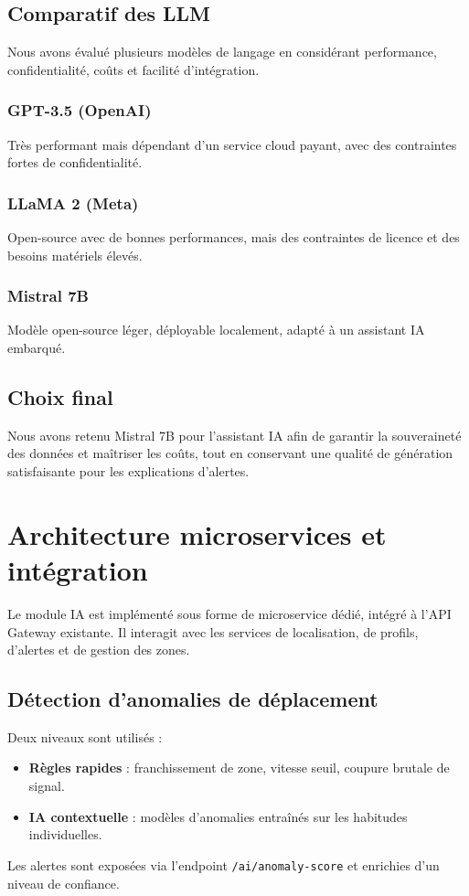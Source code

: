 \subsection{Comparatif des LLM}
Nous avons évalué plusieurs modèles de langage en considérant performance, confidentialité, coûts et facilité d'intégration.

\subsubsection{GPT-3.5 (OpenAI)}
Très performant mais dépendant d'un service cloud payant, avec des contraintes fortes de confidentialité.

\subsubsection{LLaMA 2 (Meta)}
Open-source avec de bonnes performances, mais des contraintes de licence et des besoins matériels élevés.

\subsubsection{Mistral 7B}
Modèle open-source léger, déployable localement, adapté à un assistant IA embarqué.

\subsection{Choix final}
Nous avons retenu Mistral 7B pour l'assistant IA afin de garantir la souveraineté des données et maîtriser les coûts, tout en conservant une qualité de génération satisfaisante pour les explications d'alertes.

\section{Architecture microservices et intégration}
Le module IA est implémenté sous forme de microservice dédié, intégré à l'API Gateway existante. Il interagit avec les services de localisation, de profils, d'alertes et de gestion des zones.

\subsection{Détection d'anomalies de déplacement}
Deux niveaux sont utilisés :
\begin{itemize}
    \item \textbf{Règles rapides} : franchissement de zone, vitesse seuil, coupure brutale de signal.
    \item \textbf{IA contextuelle} : modèles d'anomalies entraînés sur les habitudes individuelles.
\end{itemize}
Les alertes sont exposées via l'endpoint \texttt{/ai/anomaly-score} et enrichies d'un niveau de confiance.

